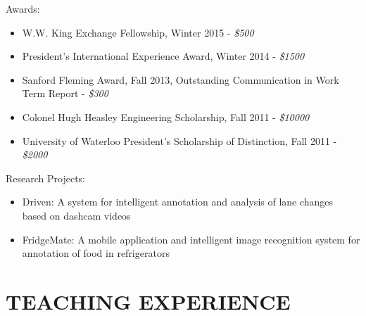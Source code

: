 \documentclass[10pt]{res} %
\begin{document}
Awards:
\begin{itemize} 
    \item W.W. King Exchange Fellowship, Winter 2015 - {\sl\$500}
    \item President's International Experience Award, Winter 2014 - {\sl\$1500}
    \item Sanford Fleming Award, Fall 2013, Outstanding Communication in Work Term Report - {\sl\$300}
    \item Colonel Hugh Heasley Engineering Scholarship, Fall 2011 - {\sl\$10000}
    \item University of Waterloo President's Scholarship of Distinction, Fall 2011 - {\sl\$2000}
\end{itemize}

Research Projects:
\begin{itemize}   
    \item Driven: A system for intelligent annotation and analysis of lane changes based on dashcam videos
    \item FridgeMate: A mobile application and intelligent image recognition system for annotation of food in refrigerators
\end{itemize}



\section{TEACHING EXPERIENCE}

\vspace{0.2in} %
\end{document}

